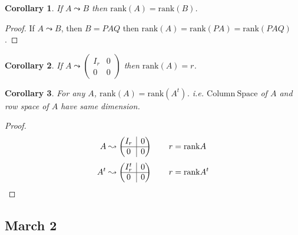 \documentclass[12pt]{article}
\theoremstyle{plain}
\newtheorem{corollary}{Corollary}[subsection]
\newcommand{\rank}{\mathrm{rank}}
\newcommand{\ColSpace}{\mathrm{Column \ Space}}
\newcommand{\rvline}{\hspace*{-\arraycolsep}\vline\hspace*{-\arraycolsep}}
\begin{document}
\begin{corollary}
	If $A \leadsto B$ then $\rank(A) = \rank(B)$. 
\end{corollary}
\begin{proof}
	If $A \leadsto B$, then $B = PAQ$ then $\rank(A) = \rank(PA) = \rank(PAQ)$.
\end{proof}

\begin{corollary}
	If $A \leadsto \begin{pmatrix} I_r & 0 \\ 0 & 0
	\end{pmatrix}$ then $\rank(A) = r$. 
\end{corollary}


\begin{corollary}
	For any $A$, $\rank(A) = \rank(A^t)$. i.e. $\ColSpace$ of $A$ and row
	space of $A$ have same dimension. 
\end{corollary}
\begin{proof}
	\[
		A \leadsto 
		\begin{pmatrix}
			I_r & \rvline & 0 \\ \hline
			0 & \rvline & 0
		\end{pmatrix}
		\qquad r = \rank A
	\]
	\[
		A^t \leadsto 
		\begin{pmatrix}
			I_r^t & \rvline & 0 \\ \hline
			0 & \rvline & 0
		\end{pmatrix}
		\qquad r = \rank A^t
	\]
\end{proof}







\newpage
\subsection{March 2}
\end{document}
